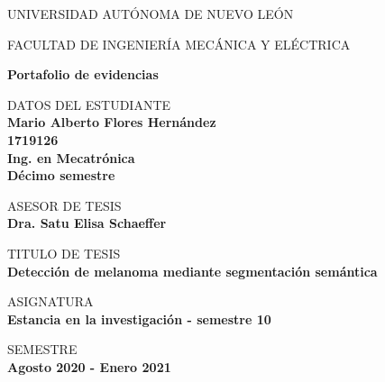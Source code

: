 \documentclass{article}
\begin{document}
	\begin{center}
	\LARGE
	UNIVERSIDAD AUTÓNOMA DE NUEVO LEÓN
	
	\vspace{0.2cm}
	\LARGE
	FACULTAD DE INGENIERÍA MECÁNICA Y ELÉCTRICA
	
	\vspace{0.5cm}	
	\Large
	\textbf{Portafolio de evidencias}

	\vspace{1cm}
	\normalsize	
	DATOS DEL ESTUDIANTE \\
	\vspace{.3cm}
	\large
	\textbf{Mario Alberto Flores Hernández \\ 1719126 \\ Ing. en Mecatrónica\\ Décimo semestre}
	
	\vspace{1.3cm}
	\normalsize	
	ASESOR DE TESIS \\
	\vspace{.3cm}
	\large
	\textbf{Dra. Satu Elisa Schaeffer}
	
	\vspace{1.3cm}
	\normalsize	
	TITULO DE TESIS \\
	\vspace{.3cm}
	\large
	\textbf{Detección de melanoma mediante segmentación semántica}
	
	\vspace{1.3cm}
	\normalsize	
	ASIGNATURA \\
	\vspace{.3cm}
	\large
	\textbf{Estancia en la investigación - semestre 10}
	
	\vspace{1.3cm}
	\normalsize	
	SEMESTRE \\
	\vspace{.3cm}
	\large
	\textbf{Agosto 2020 - Enero 2021}

	\end{center}
	
	\newpage
	
\end{document}
